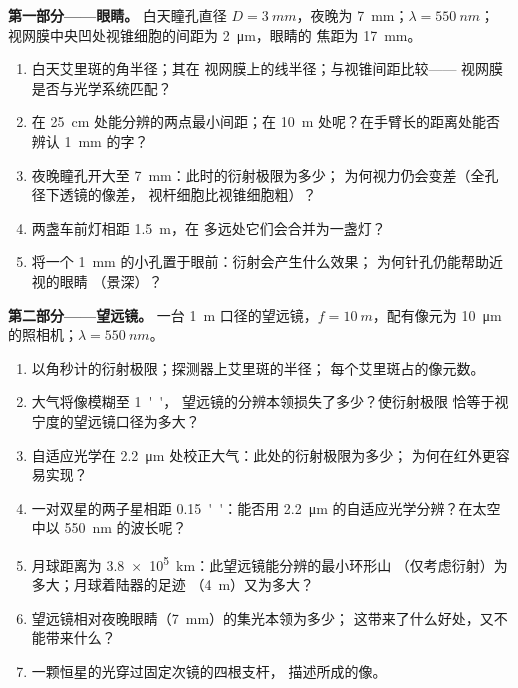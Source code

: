 \begin{problem}
\label{pb:b2:diffraction:1}

\medskip
\noindent\textbf{第一部分——眼睛。}
白天瞳孔直径 $D = \qty{3}{mm}$，夜晚为 \qty{7}{mm}；$\lambda = \qty{550}{nm}$；
视网膜中央凹处视锥细胞的间距为 \qty{2}{\micro m}，眼睛的
焦距为 \qty{17}{mm}。
\begin{enumerate}
  \item 白天艾里斑的角半径；其在
        视网膜上的线半径；与视锥间距比较——
        视网膜是否与光学系统匹配？
  \item 在 \qty{25}{cm} 处能分辨的两点最小间距；在
        \qty{10}{m} 处呢？在手臂长的距离处能否辨认 \qty{1}{mm} 的字？
  \item 夜晚瞳孔开大至 \qty{7}{mm}：此时的衍射极限为多少；
        为何视力仍会变差（全孔径下透镜的像差，
        视杆细胞比视锥细胞粗）？
  \item 两盏车前灯相距 \qty{1.5}{m}，在
        多远处它们会合并为一盏灯？
  \item 将一个 \qty{1}{mm} 的小孔置于眼前：衍射会产生什么效果；
        为何针孔仍能帮助近视的眼睛
        （景深）？
\end{enumerate}

\medskip
\noindent\textbf{第二部分——望远镜。}
一台 \qty{1}{m} 口径的望远镜，$f = \qty{10}{m}$，配有像元为
\qty{10}{\micro m} 的照相机；$\lambda = \qty{550}{nm}$。
\begin{enumerate}[resume]
  \item 以角秒计的衍射极限；探测器上艾里斑的半径；
        每个艾里斑占的像元数。
  \item 大气将像模糊至 \qty{1}{''}，
        望远镜的分辨本领损失了多少？使衍射极限
        恰等于视宁度的望远镜口径为多大？
  \item 自适应光学在 \qty{2.2}{\micro m} 处校正大气：此处的衍射极限为多少；
        为何在红外更容易实现？
  \item 一对双星的两子星相距 \qty{0.15}{''}：能否用 \qty{2.2}{\micro m}
        的自适应光学分辨？在太空中以 \qty{550}{nm} 的波长呢？
  \item 月球距离为 \qty{3.8e5}{km}：此望远镜能分辨的最小环形山
        （仅考虑衍射）为多大；月球着陆器的足迹
        （\qty{4}{m}）又为多大？
  \item 望远镜相对夜晚眼睛（\qty{7}{mm}）的集光本领为多少；
        这带来了什么好处，又不能带来什么？
  \item 一颗恒星的光穿过固定次镜的四根支杆，
        描述所成的像。
\end{enumerate}


\end{problem}
